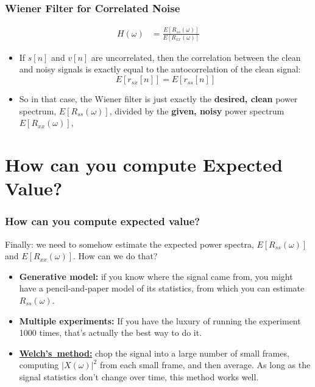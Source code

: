 \documentclass{beamer}
\begin{document}
\begin{frame}
  \frametitle{Wiener Filter for Correlated Noise}
  \begin{align*}
    H(\omega)
    &=\frac{E\left[R_{ss}(\omega)\right]}{E\left[R_{xx}(\omega)\right]}
  \end{align*}
  \begin{itemize}
  \item If $s[n]$ and $v[n]$ are uncorrelated, then the correlation
    between the clean and noisy signals is exactly equal to the
    autocorrelation of the clean signal:
    \begin{displaymath}
      E\left[r_{sx}[n]\right] = E\left[r_{ss}[n]\right]
    \end{displaymath}
  \item So in that case, the Wiener filter is just exactly the {\bf
    desired, clean} power spectrum, $E\left[R_{ss}(\omega)\right]$,
    divided by the {\bf given, noisy} power spectrum
    $E\left[R_{xx}(\omega)\right]$,
  \end{itemize}
\end{frame}

\section[Expectation]{How can you compute Expected Value?}
\setcounter{subsection}{1}

\begin{frame}
  \frametitle{How can you compute expected value?}

  Finally: we need to somehow estimate the expected power spectra,
  $E\left[R_{ss}(\omega)\right]$ and $E\left[R_{xx}(\omega)\right]$.
  How can we do that?
  \begin{itemize}
  \item {\bf Generative model:} if you know where the signal came from, you might
    have a pencil-and-paper model of its statistics, from which you can
    estimate $R_{ss}(\omega)$.
  \item {\bf Multiple experiments:} If you have the luxury of running
    the experiment 1000 times, that's actually the best way to do it.
  \item
    \href{https://ieeexplore.ieee.org/document/1161901}{\bf{Welch's~method:}}
    chop the signal into a large number of small frames, computing
    $|X(\omega)|^2$ from each small frame, and then average.  As long
    as the signal statistics don't change over time, this method works
    well.
  \end{itemize}
\end{frame}
\end{document}

